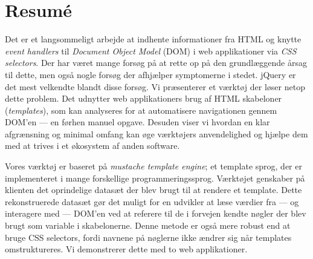 \documentclass[thesis.tex]{subfiles}
\begin{document}
\chapter*{Resum\'e}
\label{chap:resume}

Det er et langsommeligt arbejde at indhente informationer fra HTML og
knytte \emph{event handlers} til \emph{Document Object Model} (DOM) i
web applikationer via \emph{CSS selectors}.
Der har været mange forsøg på at rette op på den grundlæggende årsag til dette,
men også nogle forsøg der afhjælper symptomerne i stedet.
jQuery er det mest velkendte blandt disse forsøg.
Vi præsenterer et værktøj der løser netop dette problem.
Det udnytter web applikationers brug af HTML skabeloner (\emph{templates}),
som kan analyseres for at automatisere navigationen gennem DOM'en
--- en førhen manuel opgave.
Desuden viser vi hvordan en klar afgrænsning og minimal omfang
kan øge værktøjers anvendelighed og hjælpe dem med at trives i et økosystem af
anden software.

Vores værktøj er baseret på \emph{mustache template engine}; et template sprog,
der er implementeret i mange forskellige programmeringssprog.
Værktøjet genskaber på klienten det oprindelige datasæt der blev brugt til at
rendere et template.
Dette rekonstruerede datasæt gør det muligt for en udvikler at læse værdier
fra --- og interagere med --- DOM'en ved at referere til de i forvejen kendte
nøgler der blev brugt som variable i skabelonerne.
Denne metode er også mere robust end at bruge CSS selectors,
fordi navnene på nøglerne ikke ændrer sig når templates omstruktureres.
Vi demonstrerer dette med to web applikationer.
\end{document}
